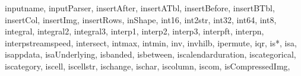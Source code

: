 {{        inputname,%
        inputParser,%
        insertAfter,%
        insertATbl,%
        insertBefore,%
        insertBTbl,%
        insertCol,%
        insertImg,%
        insertRows,%
        inShape,%
        int16,%
        int2str,%
        int32,%
        int64,%
        int8,%
        integral,%
        integral2,%
        integral3,%
        interp1,%
        interp2,%
        interp3,%
        interpft,%
        interpn,%
        interpstreamspeed,%
        intersect,%
        intmax,%
        intmin,%
        inv,%
        invhilb,%
        ipermute,%
        iqr,%
        is*,%
        isa,%
        isappdata,%
        isaUnderlying,%
        isbanded,%
        isbetween,%
        iscalendarduration,%
        iscategorical,%
        iscategory,%
        iscell,%
        iscellstr,%
        ischange,%
        ischar,%
        iscolumn,%
        iscom,%
        isCompressedImg,%
}}
